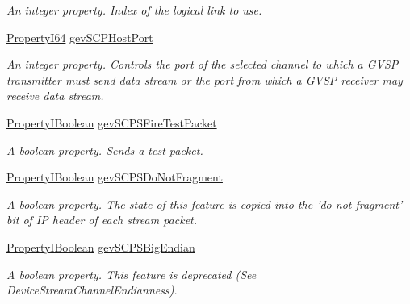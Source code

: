 \begin{DoxyCompactItemize}
\begin{DoxyCompactList}\small\item\em An integer property. Index of the logical link to use. \end{DoxyCompactList}\item 
\hyperlink{group___common_interface_ga81749b2696755513663492664a18a893}{Property\+I64} \hyperlink{classmv_i_m_p_a_c_t_1_1acquire_1_1_gen_i_cam_1_1_transport_layer_control_af2fd412fe30ab9192ef3f097eaf015c5}{gev\+S\+C\+P\+Host\+Port}
\begin{DoxyCompactList}\small\item\em An integer property. Controls the port of the selected channel to which a G\+V\+S\+P transmitter must send data stream or the port from which a G\+V\+S\+P receiver may receive data stream. \end{DoxyCompactList}\item 
\hyperlink{group___common_interface_ga44f9437e24b21b6c93da9039ec6786aa}{Property\+I\+Boolean} \hyperlink{classmv_i_m_p_a_c_t_1_1acquire_1_1_gen_i_cam_1_1_transport_layer_control_a8a5d17d229de12e2dce323c425809af8}{gev\+S\+C\+P\+S\+Fire\+Test\+Packet}
\begin{DoxyCompactList}\small\item\em A boolean property. Sends a test packet. \end{DoxyCompactList}\item 
\hyperlink{group___common_interface_ga44f9437e24b21b6c93da9039ec6786aa}{Property\+I\+Boolean} \hyperlink{classmv_i_m_p_a_c_t_1_1acquire_1_1_gen_i_cam_1_1_transport_layer_control_a71bd765c9c0152bc2fd66ddc0466db79}{gev\+S\+C\+P\+S\+Do\+Not\+Fragment}
\begin{DoxyCompactList}\small\item\em A boolean property. The state of this feature is copied into the 'do not fragment' bit of I\+P header of each stream packet. \end{DoxyCompactList}\item 
\hyperlink{group___common_interface_ga44f9437e24b21b6c93da9039ec6786aa}{Property\+I\+Boolean} \hyperlink{classmv_i_m_p_a_c_t_1_1acquire_1_1_gen_i_cam_1_1_transport_layer_control_afce4d838f778e9d0f3459231c0284b2f}{gev\+S\+C\+P\+S\+Big\+Endian}
\begin{DoxyCompactList}\small\item\em A boolean property. This feature is deprecated (See Device\+Stream\+Channel\+Endianness). \end{DoxyCompactList}\item 

\end{DoxyCompactItemize}
